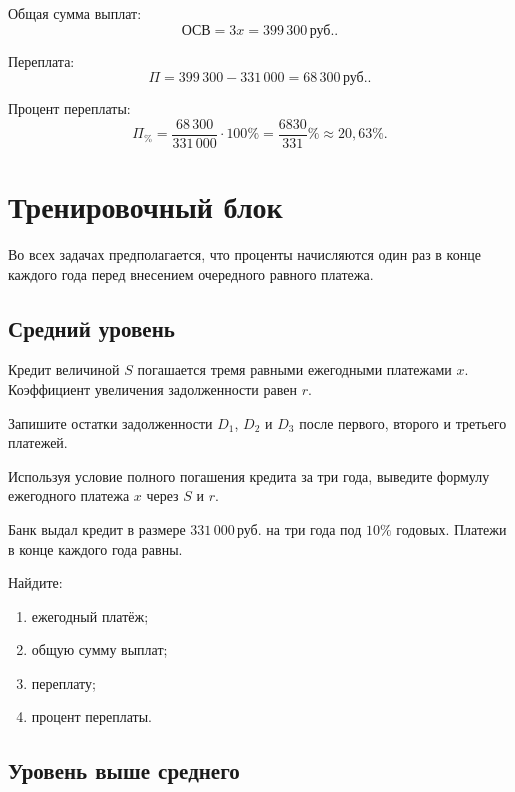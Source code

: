 \documentclass[a4paper,12pt]{article}
\newcommand{\rub}{\,\text{руб.}}
\begin{document}
Общая сумма выплат:
\[
\text{ОСВ}=3x=399\,300\rub.
\]

Переплата:
\[
\Pi=399\,300-331\,000=68\,300\rub.
\]

Процент переплаты:
\[
\Pi_{\%}
=
\frac{68\,300}{331\,000}\cdot100\%
=
\frac{6830}{331}\%
\approx 20{,}63\%.
\]


\newpage

\section*{Тренировочный блок}

Во всех задачах предполагается, что проценты начисляются один раз в конце
каждого года перед внесением очередного равного платежа.

\subsection*{Средний уровень}

\begin{training}
  \item
  Кредит величиной \(S\) погашается тремя равными ежегодными платежами \(x\).
  Коэффициент увеличения задолженности равен \(r\).

  Запишите остатки задолженности \(D_1\), \(D_2\) и \(D_3\) после первого,
  второго и третьего платежей.

  \item
  Используя условие полного погашения кредита за три года, выведите формулу
  ежегодного платежа \(x\) через \(S\) и \(r\).

  \item
  Банк выдал кредит в размере \(331\,000\rub\) на три года под \(10\%\)
  годовых. Платежи в конце каждого года равны.

  Найдите:
  \begin{enumerate}[label=\alph*),leftmargin=2em]
    \item ежегодный платёж;
    \item общую сумму выплат;
    \item переплату;
    \item процент переплаты.
  \end{enumerate}
\end{training}

\subsection*{Уровень выше среднего}
\end{document}
